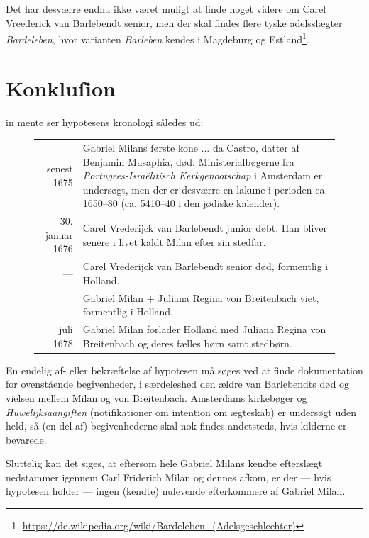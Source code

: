 \documentclass[
	a4paper,
	12pt,
	final
]{memoir}
\begin{document}
Det har desværre endnu ikke været muligt at finde noget videre om Carel Vreederick van Barlebendt senior, men der skal findes flere tyske adelsslægter \emph{Bardeleben}, hvor varianten \emph{Barleben} kendes i Magdeburg og Estland\footnote{  \url{https://de.wikipedia.org/wiki/Bardeleben_(Adelsgeschlechter)}}.

\section{Konkluſion}

 in mente ser hypotesens kronologi således ud:

\begin{savenotes}%
\begin{figure}[H]%
\centerfloat%
\begin{tabular}{r p{}}
	senest 1675 & Gabriel Milans første kone ... da Castro, datter af Benjamin Musaphia, død. Ministerialbøgerne fra \emph{Portugees-Israëlitisch Kerkgenootschap} i Amsterdam er undersøgt, men der er desværre en lakune i perioden ca. 1650--80 (ca. 5410--40 i den jødiske kalender). \\
	30. januar 1676 & Carel Vrederijck van Barlebendt junior døbt. Han bliver senere i livet kaldt Milan efter sin stedfar. \\
	--- & Carel Vrederijck van Barlebendt senior død, formentlig i Holland. \\
	--- & Gabriel Milan + Juliana Regina von Breitenbach viet, formentlig i Holland. \\
	juli 1678 & Gabriel Milan forlader Holland med Juliana Regina von Breitenbach og deres fælles børn samt stedbørn. \\
\end{tabular}%
\end{figure}%
\end{savenotes}

En endelig af- eller bekræftelse af hypotesen må søges ved at finde dokumentation for ovenstående begivenheder, i særdeleshed den ældre van Barlebendts død og vielsen mellem Milan og von Breitenbach. Amsterdams kirkebøger og \emph{Huwelijksaangiften} (notifikationer om intention om ægteskab) er undersøgt uden held, så (en del af) begivenhederne skal nok findes andetsteds, hvis kilderne er bevarede.

Sluttelig kan det siges, at eftersom hele Gabriel Milans kendte efterslægt nedstammer igennem Carl Friderich Milan og dennes afkom, er der --- hvis hypotesen holder --- ingen (kendte) nulevende efterkommere af Gabriel Milan.

%
\end{document}
